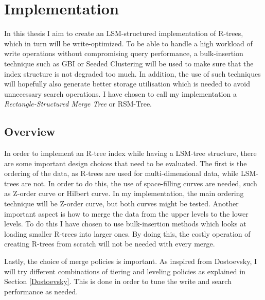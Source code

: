 \chapter{Implementation}

In this thesis I aim to create an LSM-structured implementation of R-trees, which in turn will be write-optimized. To be able to handle a high workload of write operations without compromising query performance, a bulk-insertion technique such as GBI\cite{GBI} or Seeded Clustering\cite{SeededClustering} will be used to make sure that the index structure is not degraded too much. In addition, the use of such techniques will hopefully also generate better storage utilisation which is needed to avoid unnecessary search operations. I have chosen to call my implementation a \emph{Rectangle-Structured Merge Tree} or RSM-Tree.

\section{Overview}
In order to implement an R-tree index while having a LSM-tree structure, there are some important design choices that need to be evaluated. The first is the ordering of the data, as R-trees are used for multi-dimensional data, while LSM-trees are not. In order to do this, the use of space-filling curves are needed, such as Z-order curve or Hilbert curve. In my implementation, the main ordering technique will be Z-order curve, but both curves might be tested. Another important aspect is how to merge the data from the upper levels to the lower levels. To do this I have chosen to use bulk-insertion methods which looks at loading smaller R-trees into larger ones. By doing this, the costly operation of creating R-trees from scratch will not be needed with every merge.\newline

\noindent
Lastly, the choice of merge policies is important. As inspired from Dostoevsky\cite{Dostoevsky}, I will try different combinations of tiering and leveling policies as explained in Section \ref{Dostoevsky}. This is done in order to tune the write and search performance as needed.  


